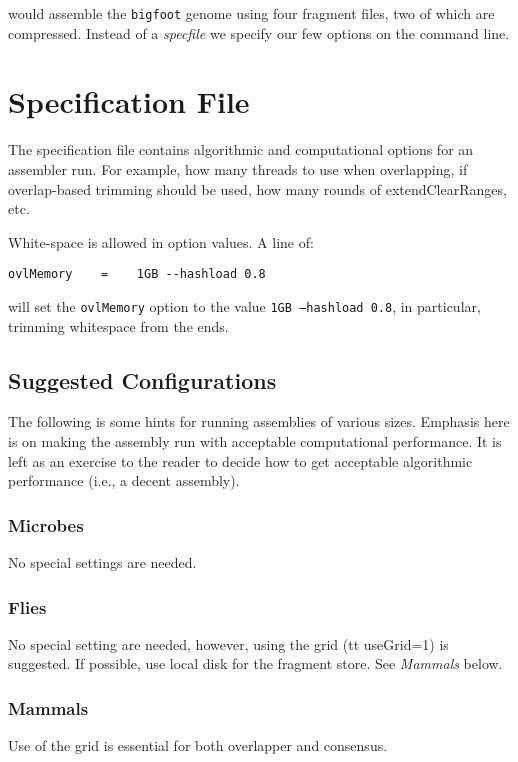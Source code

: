 \documentclass[twoside,11pt]{article}
\begin{document}
would assemble the {\tt bigfoot} genome using four fragment files, two
of which are compressed.  Instead of a {\it specfile} we specify our
few options on the command line.

\section{Specification File}

The specification file contains algorithmic and computational options
for an assembler run.  For example, how many threads to use when
overlapping, if overlap-based trimming should be used, how many rounds
of extendClearRanges, etc.

White-space is allowed in option values.  A line of:
\begin{verbatim}
ovlMemory    =    1GB --hashload 0.8
\end{verbatim}
will set the {\tt ovlMemory} option to the value {\tt 1GB --hashload
0.8}, in particular, trimming whitespace from the ends.

\subsection{Suggested Configurations}

The following is some hints for running assemblies of various sizes.
Emphasis here is on making the assembly run with acceptable
computational performance.  It is left as an exercise to the reader to
decide how to get acceptable algorithmic performance (i.e., a decent
assembly).

\subsubsection{Microbes}

No special settings are needed.

\subsubsection{Flies}

No special setting are needed, however, using the grid ({tt
useGrid=1}) is suggested.  If possible, use local disk for the
fragment store.  See {\em Mammals} below.

\subsubsection{Mammals}

Use of the grid is essential for both overlapper and consensus.
\end{document}
